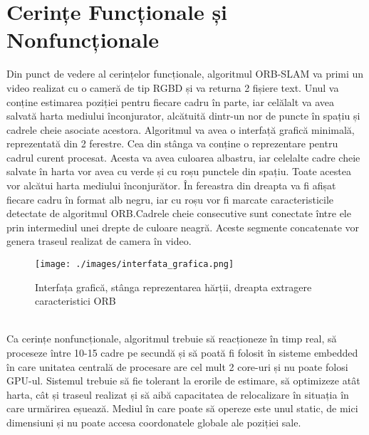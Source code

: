 \documentclass[12pt,a4paper]{report}
\begin{document}
\section{Cerințe Funcționale și Nonfuncționale}
Din punct de vedere al cerințelor funcționale, algoritmul ORB-SLAM va primi 
un video realizat cu o cameră de tip RGBD și va returna 2 fișiere text. Unul va conține
estimarea poziției pentru fiecare cadru în parte, iar celălalt va avea salvată harta 
mediului înconjurator, alcătuită dintr-un nor de puncte în spațiu și cadrele cheie
asociate acestora. Algoritmul va avea o interfață grafică minimală, reprezentată din 2 
ferestre. Cea din stânga va conține o reprezentare pentru cadrul curent procesat. 
Acesta va avea culoarea albastru, iar celelalte cadre cheie salvate în harta vor avea cu 
verde și cu roșu punctele din spațiu. Toate acestea vor alcătui harta mediului
înconjurător. În fereastra din dreapta va fi afișat fiecare cadru în format alb negru,
iar cu roșu vor fi marcate caracteristicile detectate de algoritmul ORB.\@ Cadrele cheie 
consecutive sunt conectate între ele prin intermediul unei drepte de culoare neagră.
Aceste segmente concatenate vor genera traseul realizat de camera în video. 
\begin{figure}[htbp] 
  \centering
  \texttt{[image: ./images/interfata\_grafica.png]}
  \caption{Interfața grafică, stânga reprezentarea hărții, dreapta extragere caracteristici ORB}\label{fig:exemplu_imagine}
\end{figure}  \\         
Ca cerințe nonfuncționale, algoritmul trebuie să reacționeze în timp real, să 
proceseze între 10{-}15 cadre pe secundă și să poată fi folosit în sisteme embedded
în care unitatea centrală de procesare are cel mult 2 core-uri și nu poate folosi GPU-ul.
Sistemul trebuie să fie tolerant la erorile de estimare, să optimizeze atât
harta, cât și traseul realizat și să aibă capacitatea de relocalizare în situația în care
urmărirea eșuează. Mediul în care poate să opereze este unul static, de
mici dimensiuni și nu poate accesa coordonatele globale ale poziției sale.
\end{document}
